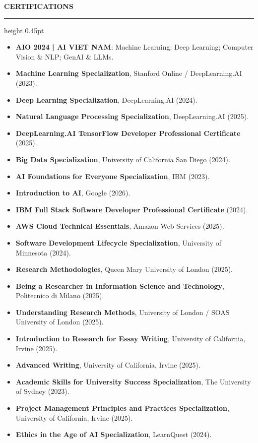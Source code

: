 \documentclass[10pt]{article}
\newcommand{\cvsection}[1]{%
    \vspace{6.2pt}%
    {\color{accent}\bfseries\small #1}\par
    \vspace{2.3pt}%
    {\color{rulegray}\hrule height 0.45pt}\vspace{4.0pt}%
}
\begin{document}
\cvsection{CERTIFICATIONS}
\begin{itemize}
    \item \textbf{AIO 2024 | AI VIET NAM}: Machine Learning; Deep Learning; Computer Vision \& NLP; GenAI \& LLMs.
    \item \textbf{Machine Learning Specialization}, Stanford Online / DeepLearning.AI (2023).
    \item \textbf{Deep Learning Specialization}, DeepLearning.AI (2024).
    \item \textbf{Natural Language Processing Specialization}, DeepLearning.AI (2025).
    \item \textbf{DeepLearning.AI TensorFlow Developer Professional Certificate} (2025).
    \item \textbf{Big Data Specialization}, University of California San Diego (2024).
    \item \textbf{AI Foundations for Everyone Specialization}, IBM (2023).
    \item \textbf{Introduction to AI}, Google (2026).
    \item \textbf{IBM Full Stack Software Developer Professional Certificate} (2024).
    \item \textbf{AWS Cloud Technical Essentials}, Amazon Web Services (2025).
    \item \textbf{Software Development Lifecycle Specialization}, University of Minnesota (2024).
    \item \textbf{Research Methodologies}, Queen Mary University of London (2025).
    \item \textbf{Being a Researcher in Information Science and Technology}, Politecnico di Milano (2025).
    \item \textbf{Understanding Research Methods}, University of London / SOAS University of London (2025).
    \item \textbf{Introduction to Research for Essay Writing}, University of California, Irvine (2025).
    \item \textbf{Advanced Writing}, University of California, Irvine (2025).
    \item \textbf{Academic Skills for University Success Specialization}, The University of Sydney (2023).
    \item \textbf{Project Management Principles and Practices Specialization}, University of California, Irvine (2025).
    \item \textbf{Ethics in the Age of AI Specialization}, LearnQuest (2024).
\end{itemize}
\end{document}
